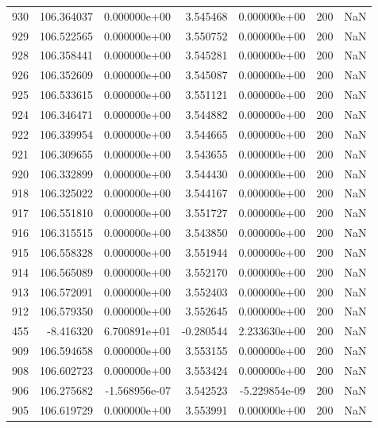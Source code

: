 \begin{tabular}{rrrrrrr}
 930 & 106.364037 &  0.000000e+00 &  3.545468 &  0.000000e+00 &         200 & NaN \\
 929 & 106.522565 &  0.000000e+00 &  3.550752 &  0.000000e+00 &         200 & NaN \\
 928 & 106.358441 &  0.000000e+00 &  3.545281 &  0.000000e+00 &         200 & NaN \\
 926 & 106.352609 &  0.000000e+00 &  3.545087 &  0.000000e+00 &         200 & NaN \\
 925 & 106.533615 &  0.000000e+00 &  3.551121 &  0.000000e+00 &         200 & NaN \\
 924 & 106.346471 &  0.000000e+00 &  3.544882 &  0.000000e+00 &         200 & NaN \\
 922 & 106.339954 &  0.000000e+00 &  3.544665 &  0.000000e+00 &         200 & NaN \\
 921 & 106.309655 &  0.000000e+00 &  3.543655 &  0.000000e+00 &         200 & NaN \\
 920 & 106.332899 &  0.000000e+00 &  3.544430 &  0.000000e+00 &         200 & NaN \\
 918 & 106.325022 &  0.000000e+00 &  3.544167 &  0.000000e+00 &         200 & NaN \\
 917 & 106.551810 &  0.000000e+00 &  3.551727 &  0.000000e+00 &         200 & NaN \\
 916 & 106.315515 &  0.000000e+00 &  3.543850 &  0.000000e+00 &         200 & NaN \\
 915 & 106.558328 &  0.000000e+00 &  3.551944 &  0.000000e+00 &         200 & NaN \\
 914 & 106.565089 &  0.000000e+00 &  3.552170 &  0.000000e+00 &         200 & NaN \\
 913 & 106.572091 &  0.000000e+00 &  3.552403 &  0.000000e+00 &         200 & NaN \\
 912 & 106.579350 &  0.000000e+00 &  3.552645 &  0.000000e+00 &         200 & NaN \\
 455 &  -8.416320 &  6.700891e+01 & -0.280544 &  2.233630e+00 &         200 & NaN \\
 909 & 106.594658 &  0.000000e+00 &  3.553155 &  0.000000e+00 &         200 & NaN \\
 908 & 106.602723 &  0.000000e+00 &  3.553424 &  0.000000e+00 &         200 & NaN \\
 906 & 106.275682 & -1.568956e-07 &  3.542523 & -5.229854e-09 &         200 & NaN \\
 905 & 106.619729 &  0.000000e+00 &  3.553991 &  0.000000e+00 &         200 & NaN \\

\end{tabular}
